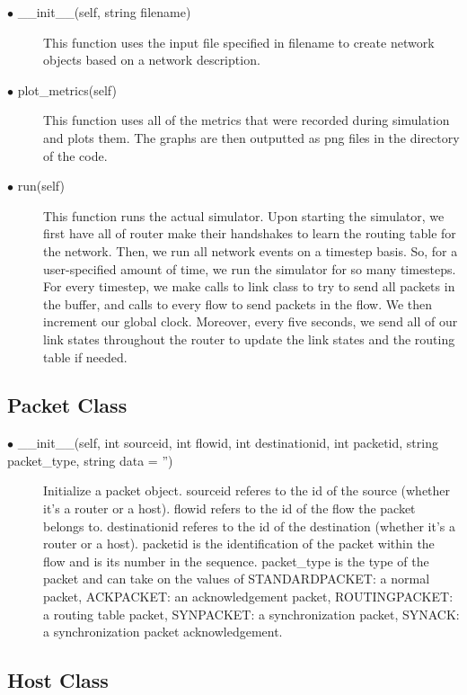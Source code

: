 \documentclass{article}
\begin{document}
\begin{description}
	\item[$\bullet$ \_\_init\_\_(self, string filename)] This function uses the input file specified in filename to create network objects based on a network description.
	\item[$\bullet$ plot\_metrics(self)] This function uses all of the metrics that were recorded during simulation and plots them. The graphs are then outputted as png files in the directory of the code.
	\item[$\bullet$ run(self)] This function runs the actual simulator. Upon starting the simulator, we first have all of router make their handshakes to learn the routing table for the network. Then, we run all network events on a timestep basis. So, for a user-specified amount of time, we run the simulator for so many timesteps. For every timestep, we make calls to link class to try to send all packets in the buffer, and calls to every flow to send packets in the flow. We then increment our global clock. Moreover, every five seconds, we send all of our link states throughout the router to update the link states and the routing table if needed.

\end{description}


\subsection{Packet Class}

\begin{description}
	\item [$\bullet$ \_\_init\_\_(self, int sourceid, int flowid, int destinationid, int packetid, string packet\_type, string data = '')] Initialize a packet object. sourceid referes to the id of the source (whether it's a router or a host). flowid refers to the id of the flow the packet belongs to. destinationid referes to the id of the destination (whether it's a router or a host). packetid is the identification of the packet within the flow and is its number in the sequence. packet\_type is the type of the packet and can take on the values of STANDARDPACKET: a normal packet, ACKPACKET: an acknowledgement packet, ROUTINGPACKET: a routing table packet, SYNPACKET: a synchronization packet, SYNACK: a synchronization packet acknowledgement. 
\end{description}

\subsection{Host Class}
\end{document}
